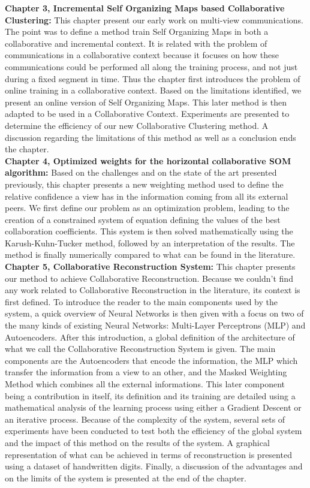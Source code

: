 \textbf{Chapter 3, Incremental Self Organizing Maps based Collaborative Clustering:} This chapter present our early work on multi-view communications. The point was to define a method train Self Organizing Maps in both a collaborative and incremental context. It is related with the problem of communications in a collaborative context because it focuses on how these communications could be performed all along the training process, and not just during a fixed segment in time. Thus the chapter first introduces the problem of online training in a collaborative context. Based on the limitations identified, we present an online version of Self Organizing Maps. This later method is then adapted to be used in a Collaborative Context. Experiments are presented to determine the efficiency of our new Collaborative Clustering method. A discussion regarding the limitations of this method as well as a conclusion ends the chapter.\\

\textbf{Chapter 4, Optimized weights for the horizontal collaborative SOM algorithm:} Based on the challenges and on the state of the art presented previously, this chapter presents a new weighting method used to define the relative confidence a view has in the information coming from all its external peers. We first define our problem as an optimization problem, leading to the creation of a constrained system of equation defining the values of the best collaboration coefficients. This system is then solved mathematically using the Karush-Kuhn-Tucker method, followed by an interpretation of the results. The method is finally numerically compared to what can be found in the literature.\\

\textbf{Chapter 5, Collaborative Reconstruction System:} This chapter presents our method to achieve Collaborative Reconstruction. Because we couldn't find any work related to Collaborative Reconstruction in the literature, its context is first defined. To introduce the reader to the main components used by the system, a quick overview of Neural Networks is then given with a focus on two of the many kinds of existing Neural Networks: Multi-Layer Perceptrons (MLP) and Autoencoders. After this introduction, a global definition of the architecture of what we call the Collaborative Reconstruction System is given. The main components are the Autoencoders that encode the information, the MLP which transfer the information from a view to an other, and the Masked Weighting Method which combines all the external informations. This later component being a contribution in itself, its definition and its training are detailed using a mathematical analysis of the learning process using either a Gradient Descent or an iterative process. Because of the complexity of the system, several sets of experiments have been conducted to test both the efficiency of the global system and the impact of this method on the results of the system. A graphical representation of what can be achieved in terms of reconstruction is presented using a dataset of handwritten digits. Finally, a discussion of the advantages and on the limits of the system is presented at the end of the chapter.\\


